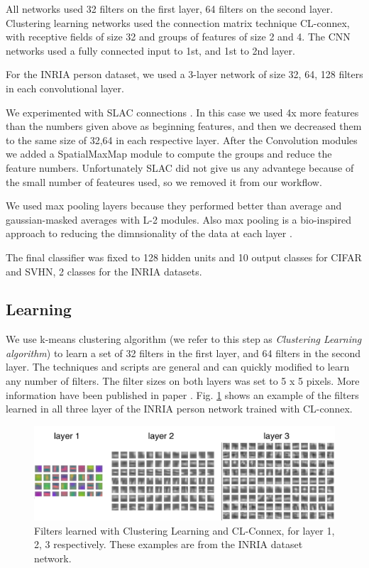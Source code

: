 \documentclass{article} %
\begin{document}
All networks used 32 filters on the first layer, 64 filters on the second layer. Clustering learning networks used the connection matrix technique CL-connex, with receptive fields of size 32 and groups of features of size 2 and 4. The CNN networks used a fully connected input to 1st, and 1st to 2nd layer. 

For the INRIA person dataset, we used a 3-layer network of size 32, 64, 128 filters in each convolutional layer.

We experimented with SLAC connections \cite{coates2012emergence}. In this case we used 4x more features than the numbers given above as beginning features, and then we decreased them to the same size of 32,64 in each respective layer. After the Convolution modules we added a SpatialMaxMap module to compute the groups and reduce the feature numbers. Unfortunately SLAC did not give us any advantege because of the small number of feateures used, so we removed it from our workflow.

We used max pooling layers because they performed better than average and gaussian-masked averages with L-2 modules. Also max pooling is a bio-inspired approach to reducing the dimnsionality of the data at each layer \cite{lampl2004intracellular}.

The final classifier was fixed to 128 hidden units and 10 output classes for CIFAR and SVHN, 2 classes for the INRIA datasets.



\subsection{Learning}
We use k-means clustering algorithm (we refer to this step as \textit{Clustering Learning algorithm}) to learn a set of 32 filters in the first layer, and 64 filters in the second layer. The techniques and scripts are general and can quickly modified to learn any number of filters. The filter sizes on both layers was set to 5 x 5 pixels. More information have been published in paper \cite {culurciello2013clustering}. Fig. \ref{fig-filters123} shows an example of the filters learned in all three layer of the INRIA person network trained with CL-connex.



\begin{figure}
\includegraphics[width=5in]{fig-filters123.pdf}
\caption{Filters learned with Clustering Learning and CL-Connex, for layer 1, 2, 3 respectively. These examples are from the INRIA dataset network.}
\label{fig-filters123}
\end{figure}
\end{document}
